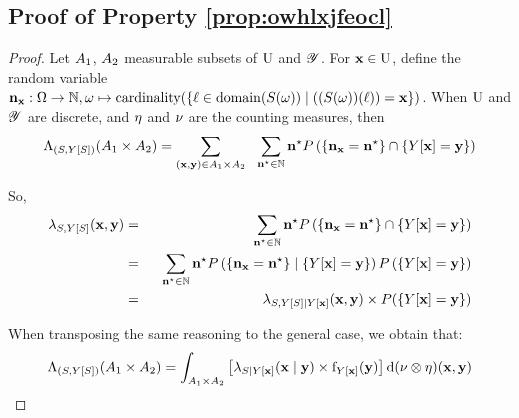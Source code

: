 \subsection{Proof of Property \ref{prop:owhlxjfeocl}}
\begin{proof}

Let $A_1$, $A_2$  measurable subsets of $\mathrm{U}$ and $\mathscr{Y}$. For $\mathbf{x}\in \mathrm{U}$, define the random variable $\mathbf{n}_{\mathbf{x}}:\Omega\to\mathbb{N}, \omega\mapsto\mathrm{cardinality}(\{\ell\in\mathrm{domain}(S(\omega))\mid ((S(\omega))(\ell))=\mathbf{x}\})$.
When $\mathrm{U}$ and $\mathscr{Y}$ are discrete, and $\eta$ and $\nu$ are the counting measures, then
$$
\Lambda_{(S,Y[S])}(A_1\times A_2)=\sum_{(\mathbf{x},\mathbf{y})\in A_1\times A_2}
   ~~\sum_{\mathbf{n}^\star\in\mathbb{N}}
    \mathbf{n}^\star
P\left(\{\mathbf{n}_{\mathbf{x}}=\mathbf{n}^\star\}\cap\{Y[\mathbf{x}]=\mathbf{y}\}\right)
$$

So,
\begin{eqnarray*}
\lambda_{S,Y[S]}(\mathbf{x},\mathbf{y})&=&\sum_{\mathbf{n}^\star\in\mathbb{N}}
    \mathbf{n}^\star
P\left(\{\mathbf{n}_{\mathbf{x}}=\mathbf{n}^\star\}\cap\{Y[\mathbf{x}]=\mathbf{y}\}\right)\\
&=&
   ~~\sum_{\mathbf{n}^\star\in\mathbb{N}}
    \mathbf{n}^\star
P\left(\{\mathbf{n}_{\mathbf{x}}=\mathbf{n}^\star\}\mid\{Y[\mathbf{x}]=\mathbf{y}\}\right)P\left(\{Y[\mathbf{x}]=\mathbf{y}\}\right)\\
&=&\lambda_{S,Y[S]\mid Y[\mathbf{x}]}(\mathbf{x},\mathbf{y})\times P(\{Y[\mathbf{x}]=\mathbf{y}\})
\end{eqnarray*}

When transposing the same reasoning to the general case, we obtain that:
$$
\Lambda_{(S,Y[S])}(A_1\times A_2)=
\int_{A_1\times A_2}
   \left[\lambda_{S\mid Y[\mathbf{x}]}(\mathbf{x}\mid\mathbf{y})\times\mathrm{f}_{Y[\mathbf{x}]}(\mathbf{y})\right]\mathrm{d}(\nu\otimes\eta)(\mathbf{x},\mathbf{y})
$$
\end{proof}

